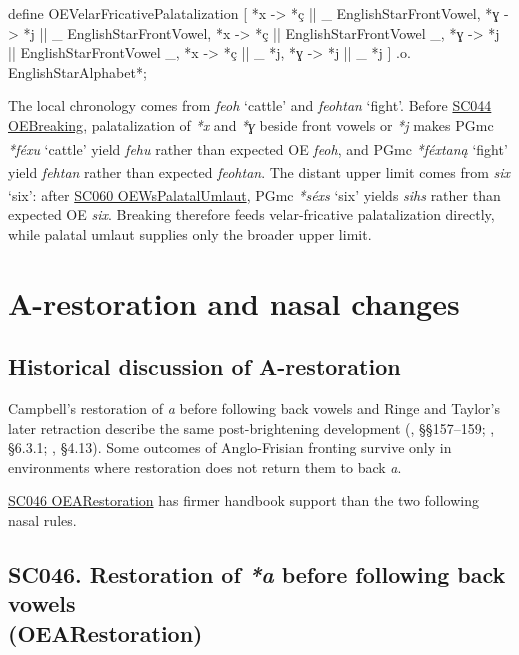 \documentclass[
  british,
  a4paper,
  openany]{book}
\providecommand{\Pred}[1]{\textsuperscript{\dag}\emph{#1}}
\providecommand{\Recon}[1]{\emph{*#1}}
{\catcode`→=\active \global\def→{\ensuremath{\rightarrow}}}
\providecommand{\texorpdfstring}[2]{#1}
\DeclareRobustCommand{\CAPRRuleHeading}[2]{%
  #1\texorpdfstring{\\(#2)}{ (#2)}%
}
\providecommand{\Pred}[1]{\textsuperscript{\dag}\emph{#1}}
\providecommand{\Recon}[1]{\emph{*#1}}
{\catcode`→=\active \global\def→{\ensuremath{\rightarrow}}}
\begin{document}
\begin{ReaderFacingFoma}
define OEVelarFricativePalatalization [
    {*x} -> {*ç} || _ EnglishStarFrontVowel,
    {*ɣ} -> {*j} || _ EnglishStarFrontVowel,
    {*x} -> {*ç} || EnglishStarFrontVowel _,
    {*ɣ} -> {*j} || EnglishStarFrontVowel _,
    {*x} -> {*ç} || _ {*j},
    {*ɣ} -> {*j} || _ {*j}
]
    .o. EnglishStarAlphabet*;
\end{ReaderFacingFoma}

The local chronology comes from \emph{feoh} `cattle' and \emph{feohtan}
`fight'. Before \hyperref[rule-OEBreaking]{SC044 OEBreaking},
palatalization of \emph{*x} and \emph{*ɣ} beside front vowels or
\emph{*j} makes PGmc \Recon{féxu} `cattle' yield \Pred{fehu} rather than
expected OE \emph{feoh}, and PGmc \Recon{féxtaną} `fight' yield
\Pred{fehtan} rather than expected \emph{feohtan}. The distant upper
limit comes from \emph{six} `six': after
\hyperref[rule-OEWsPalatalUmlaut]{SC060 OEWsPalatalUmlaut}, PGmc
\Recon{séxs} `six' yields \Pred{sihs} rather than expected OE
\emph{six}. Breaking therefore feeds velar-fricative palatalization
directly, while palatal umlaut supplies only the broader upper limit.

\newpage

\section{A-restoration and nasal
changes}\label{a-restoration-and-nasal-changes}

\subsection{Historical discussion of
A-restoration}\label{historical-discussion-of-a-restoration}

Campbell's restoration of \emph{a} before following back vowels and
Ringe and Taylor's later retraction describe the same post-brightening
development (,
§§157--159; , §6.3.1; , §4.13). Some
outcomes of Anglo-Frisian fronting survive only in environments where
restoration does not return them to back \emph{a}.

\hyperref[rule-OEARestoration]{SC046 OEARestoration} has firmer handbook
support than the two following nasal rules.

\subsection{\texorpdfstring{\CAPRRuleHeading{SC046. Restoration of \emph{*a} before following back vowels}{OEARestoration}}{}}\label{rule-OEARestoration}
\end{document}

